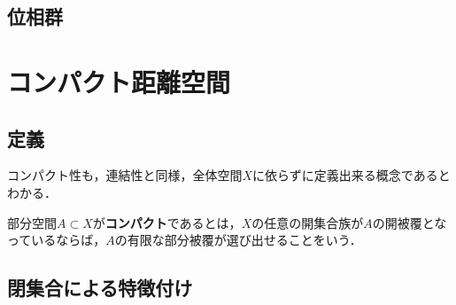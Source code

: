 \documentclass[uplatex,dvipdfmx]{jsreport}
\begin{document}
\subsection{位相群}

\section{コンパクト距離空間}

\subsection{定義}

\begin{tcolorbox}[colframe=ForestGreen, colback=ForestGreen!10!white,breakable,colbacktitle=ForestGreen!40!white,coltitle=black,fonttitle=\bfseries\sffamily,
title=]
    コンパクト性も，連結性と同様，全体空間$X$に依らずに定義出来る概念であるとわかる．
\end{tcolorbox}

\begin{definition}
    部分空間$A\subset X$が\textbf{コンパクト}であるとは，$X$の任意の開集合族が$A$の開被覆となっているならば，$A$の有限な部分被覆が選び出せることをいう．
\end{definition}

\subsection{閉集合による特徴付け}
\end{document}
